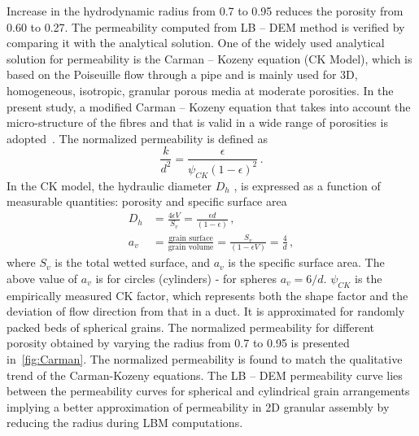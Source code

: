 Increase in the hydrodynamic radius from 0.7 to 0.95 reduces the porosity from 
0.60 to 0.27. The permeability computed from LB – DEM method is verified by 
comparing it with the analytical solution. One of the widely used analytical 
solution for permeability is the Carman – Kozeny equation (CK Model), 
which is based on the Poiseuille flow through a pipe and is mainly used for 3D, 
homogeneous, isotropic, granular porous media at moderate porosities. In the 
present study, a modified Carman – Kozeny equation that takes into account the 
micro-structure of the fibres and that is valid in a wide range of porosities 
is adopted~\citep{Yazdchi2011}. The normalized permeability is defined as
\begin{equation}
\frac{k}{d^2} = \frac{\epsilon}{\psi_{CK}(1-\epsilon)^2} \,.
\end{equation}
%
In the CK model, the hydraulic diameter $D_h$ , is expressed as a function of 
measurable quantities: porosity and specific surface area
%
\begin{align}
D_h & = \frac{4\epsilon V}{S_v}=\frac{\epsilon d}{(1 - \epsilon)} \,, \\
a_v & = \frac{\mbox{grain surface}}{\mbox{grain volume}} = 
\frac{S_v}{(1-\epsilon V)} = \frac{4}{d} \,,
\end{align}
%
where $S_v$ is the total wetted surface, and $a_v$ is the specific surface 
area. The above value of $a_v$ is for circles (cylinders) - for spheres $a_v = 
6/d$. $\psi_{CK}$ is the empirically  measured CK factor, which represents both 
the shape factor and the deviation of flow direction from that in a duct. It is 
approximated for randomly packed beds of spherical grains. The normalized 
permeability for different porosity obtained by varying the radius from 0.7 to 
0.95 is presented in~\cref{fig:Carman}. The normalized permeability is found to 
match the qualitative trend of the Carman-Kozeny equations. The LB – DEM 
permeability curve lies between the permeability curves for spherical and 
cylindrical grain arrangements implying a better approximation of permeability 
in 2D granular assembly by reducing the radius during LBM computations.

